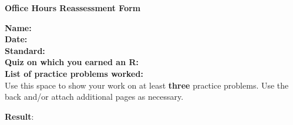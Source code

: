 \documentclass[letterpaper]{article}
\begin{document}
\begin{center}
{\Large \bf Office Hours Reassessment Form} \\
\large \course
\end{center}


	
\vspace{0.2in}

\begin{flushleft}
{\bf Name: } \underline{\phantom{xxxxxxxxxxxxxxxxxxxxxxxxxxxxxxxxxxxxxxxxxxxxxxxxxxxxxxxxx}} \\
\vspace{0.15in}
{\bf Date: } \underline{\phantom{xxxxxxxxxxxxxxxxxxxxxxxxxxxxxxxxxxxxxxxxxxxxxxxxxxxxxxxxx}} \\
\vspace{0.15in}
{\bf Standard: } \underline{\phantom{xxxxxxxxxxxxxxxxxxx}} \\
\vspace{0.15in}
{\bf Quiz on which you earned an R: } \underline{\phantom{xxxxxxxxxxxxxxxxxxxxxxxxxxxxx}} \\
\vspace{0.15in}
{\bf List of practice problems worked: } \\
\vspace{0.4in}
Use this space to show your work on at least {\bf three} practice problems.  Use the back and/or attach additional pages as necessary.


\end{flushleft}

\vfill

\hfill {\bf Result}: \fbox{\rule{0.5in}{0pt}\rule[-0.5ex]{0pt}{4ex}}
\end{document}
